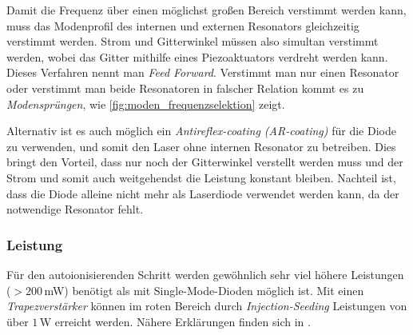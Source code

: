 Damit die Frequenz über einen möglichst großen Bereich verstimmt werden kann,
muss das Modenprofil des internen und externen Resonators gleichzeitig verstimmt
werden. Strom und Gitterwinkel müssen also simultan verstimmt werden, wobei das
Gitter mithilfe eines Piezoaktuators verdreht werden kann. Dieses Verfahren
nennt man \textit{Feed Forward}. Verstimmt man nur einen Resonator oder verstimmt
man beide Resonatoren in falscher Relation kommt es zu
\textit{Modensprüngen}, wie
\ref{fig:moden_frequenzselektion} zeigt.\par Alternativ ist es auch möglich ein \textit{Antireflex-coating (AR-coating)} für
die Diode zu verwenden, und somit den Laser ohne internen Resonator zu
betreiben.
Dies bringt den Vorteil, dass nur noch der Gitterwinkel verstellt werden muss
und der Strom und somit auch weitgehendst die Leistung konstant bleiben.
Nachteil ist, dass die Diode alleine nicht mehr als Laserdiode verwendet werden kann, da
der notwendige Resonator fehlt.

\subsubsection{Leistung}\label{subsubsec:diodenlaser_leistung}
Für den autoionisierenden Schritt werden gewöhnlich sehr viel höhere Leistungen
($>200\,$mW) benötigt als mit Single-Mode-Dioden möglich ist. Mit einen
\textit{Trapezverstärker} können im roten Bereich durch
\textit{Injection-Seeding} Leistungen von über $1\,$W erreicht werden. Nähere
Erklärungen finden sich in \cite{schumann:2001:diplomarbeit}.